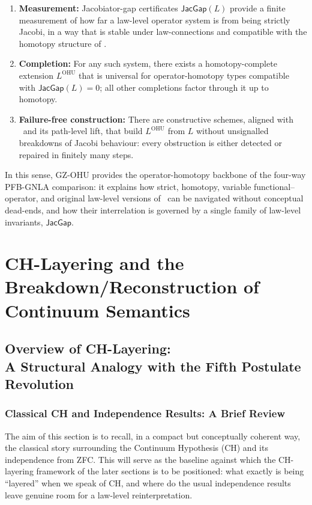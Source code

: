 \documentclass[11pt]{book}
\theoremstyle{plain}
\theoremstyle{definition}
\begin{document}
\begin{enumerate}[label=\arabic*)]
  \item \textbf{Measurement:} Jacobiator-gap certificates
        $\mathsf{JacGap}(L)$ provide a finite measurement of how far a
        law-level operator system is from being strictly Jacobi, in a
        way that is stable under law-connections and compatible with
        the homotopy structure of \GAlgebra.
  \item \textbf{Completion:} For any such system, there exists a
        homotopy-complete extension $L^{\mathrm{OHU}}$ that is
        universal for operator-homotopy types compatible with
        $\mathsf{JacGap}(L)=0$; all other completions factor through
        it up to homotopy.
  \item \textbf{Failure-free construction:} There are constructive
        schemes, aligned with \GZTLC\ and its path-level lift, that
        build $L^{\mathrm{OHU}}$ from $L$ without unsignalled
        breakdowns of Jacobi behaviour: every obstruction is either
        detected or repaired in finitely many steps.
\end{enumerate}

In this sense, GZ-OHU provides the operator-homotopy backbone of the
four-way PFB-GNLA comparison: it explains how strict, homotopy,
variable functional--operator, and original law-level versions of
\GAlgebra\ can be navigated without conceptual dead-ends, and how
their interrelation is governed by a single family of law-level
invariants, $\mathsf{JacGap}$.



\part{CH-Layering and the Breakdown/Reconstruction of Continuum Semantics}


\chapter[Overview of CH-Layering]{Overview of CH-Layering:\\
         A Structural Analogy with the Fifth Postulate Revolution}


\section{Classical CH and Independence Results: A Brief Review}


The aim of this section is to recall, in a compact but conceptually
coherent way, the classical story surrounding the Continuum Hypothesis
(CH) and its independence from ZFC. This will serve as the baseline
against which the CH-layering framework of the later sections is to be
positioned: what exactly is being “layered” when we speak of CH, and
where do the usual independence results leave genuine room for a
law-level reinterpretation.
\end{document}
